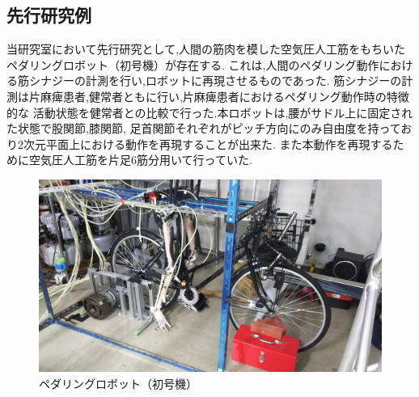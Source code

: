 \subsection{先行研究例}
当研究室において先行研究として,人間の筋肉を模した空気圧人工筋をもちいたペダリングロボット（初号機）が存在する.
これは,人間のペダリング動作における筋シナジーの計測を行い,ロボットに再現させるものであった.
筋シナジーの計測は片麻痺患者,健常者ともに行い,片麻痺患者におけるペダリング動作時の特徴的な
活動状態を健常者との比較で行った.本ロボットは,腰がサドル上に固定された状態で股関節,膝関節,
足首関節それぞれがピッチ方向にのみ自由度を持っており2次元平面上における動作を再現することが出来た.
また本動作を再現するために空気圧人工筋を片足6筋分用いて行っていた. %
\begin{figure}[h]
 \begin{center}
  \includegraphics[width=0.75\columnwidth,clip]{Photo/BackGround/1st.eps}
  \caption{ペダリングロボット（初号機）}
  \label{初号機}
  \end{center} %
\end{figure}


